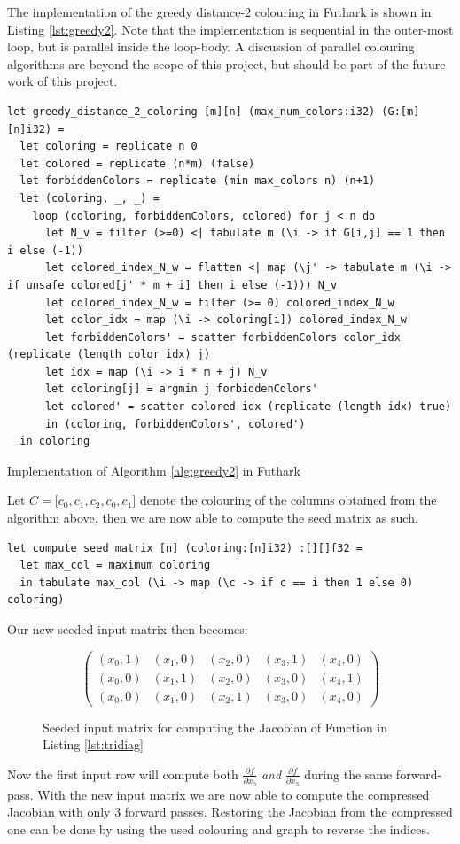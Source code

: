 	The implementation of the greedy distance-2 colouring in Futhark is shown in
	Listing \ref{lst:greedy2}. Note that the implementation is sequential in the
	outer-most loop, but is parallel inside the loop-body.  
	A  discussion of parallel colouring algorithms are beyond the scope of this
	project, but should be part of the future work of this project. 
\begin{listing}[H]
\begin{verbatim}
let greedy_distance_2_coloring [m][n] (max_num_colors:i32) (G:[m][n]i32) =
  let coloring = replicate n 0
  let colored = replicate (n*m) (false) 
  let forbiddenColors = replicate (min max_colors n) (n+1)
  let (coloring, _, _) =
    loop (coloring, forbiddenColors, colored) for j < n do
      let N_v = filter (>=0) <| tabulate m (\i -> if G[i,j] == 1 then i else (-1))
      let colored_index_N_w = flatten <| map (\j' -> tabulate m (\i -> if unsafe colored[j' * m + i] then i else (-1))) N_v
      let colored_index_N_w = filter (>= 0) colored_index_N_w
      let color_idx = map (\i -> coloring[i]) colored_index_N_w   
      let forbiddenColors' = scatter forbiddenColors color_idx (replicate (length color_idx) j)
      let idx = map (\i -> i * m + j) N_v
      let coloring[j] = argmin j forbiddenColors'
      let colored' = scatter colored idx (replicate (length idx) true)
      in (coloring, forbiddenColors', colored')
  in coloring
\end{verbatim}
\caption{Implementation of Algorithm \ref{alg:greedy2} in Futhark}
\label{lst:greedy2}
\end{listing}
	Let $C = \lbrack c_0, c_1, c_2, c_0, c_1 \rbrack$ denote the
	colouring of the columns obtained from the algorithm above, 
	then we are now able to compute the  seed matrix as such. 
\begin{listing}[H]
\begin{verbatim}
let compute_seed_matrix [n] (coloring:[n]i32) :[][]f32 =
  let max_col = maximum coloring
  in tabulate max_col (\i -> map (\c -> if c == i then 1 else 0) coloring)
\end{verbatim}
\end{listing}
Our new seeded input matrix then becomes:
\begin{figure}[H]
	$$ \left(\begin{matrix}
	(x_0, 1) & (x_1, 0) & (x_2, 0) & (x_3, 1) & (x_4, 0) \\
	(x_0, 0) & (x_1, 1) & (x_2, 0) & (x_3, 0) & (x_4, 1) \\
	(x_0, 0) & (x_1, 0) & (x_2, 1) & (x_3, 0) & (x_4, 0) 
	\end{matrix}\right) $$
	\caption{Seeded input matrix for computing the Jacobian of Function in Listing \ref{lst:tridiag}}
\end{figure}	
Now the first input row will compute both $\frac{\partial f}{\partial x_0}$ 
\emph{and} $\frac{\partial f}{\partial x_3}$ during the same forward-pass. 
With the new input matrix we are now able to compute the compressed Jacobian 
with only 3 forward passes. Restoring the Jacobian from the compressed one
can be done by using the used colouring and graph to reverse the indices. 

